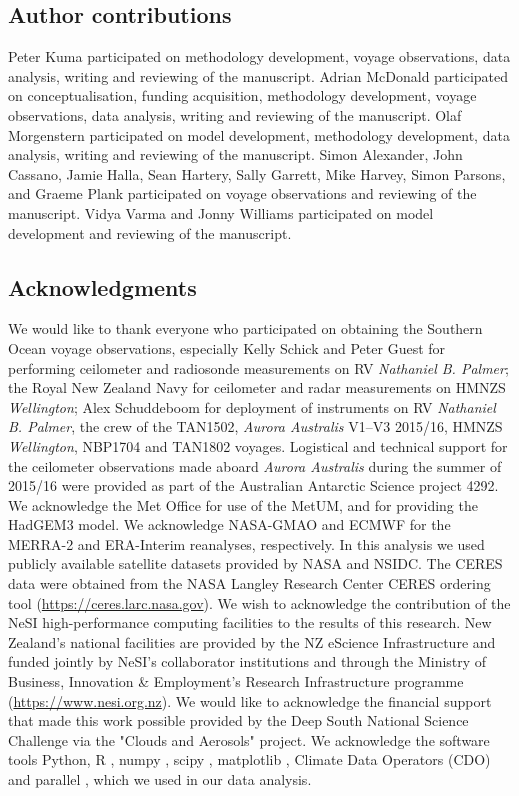 \subsection*{Author contributions}

Peter Kuma participated on methodology development, voyage observations, data
analysis, writing and reviewing of the manuscript. Adrian McDonald participated
on conceptualisation, funding acquisition, methodology development, voyage
observations, data analysis, writing and reviewing of the manuscript. Olaf
Morgenstern participated on model development, methodology development, data
analysis, writing and reviewing of the manuscript. Simon Alexander, John
Cassano, Jamie Halla, Sean Hartery, Sally Garrett, Mike Harvey, Simon Parsons,
and Graeme Plank participated on voyage observations and reviewing of the
manuscript. Vidya Varma and Jonny Williams participated on model development
and reviewing of the manuscript.

\subsection*{Acknowledgments}

We would like to thank everyone who participated on obtaining the Southern
Ocean voyage observations, especially Kelly Schick and Peter Guest for
performing ceilometer and radiosonde measurements on RV \textit{Nathaniel B.
Palmer}; the Royal New Zealand Navy for ceilometer and radar measurements on
HMNZS \textit{Wellington}; Alex Schuddeboom for deployment of instruments on RV
\textit{Nathaniel B. Palmer}, the crew of the TAN1502, \textit{Aurora
Australis} V1--V3 2015/16, HMNZS \textit{Wellington}, NBP1704 and TAN1802
voyages.  Logistical and technical support for the ceilometer observations made
aboard \textit{Aurora Australis} during the summer of 2015/16 were provided as
part of the Australian Antarctic Science project 4292. We acknowledge the Met
Office for use of the MetUM, and for providing the HadGEM3 model. We
acknowledge NASA-GMAO and ECMWF for the MERRA-2 and ERA-Interim reanalyses,
respectively. In this analysis we used publicly available satellite datasets
provided by NASA and NSIDC. The CERES data were obtained from the NASA Langley
Research Center CERES ordering tool (\url{https://ceres.larc.nasa.gov}). We
wish to acknowledge the contribution of the NeSI high-performance computing
facilities to the results of this research. New Zealand's national facilities
are provided by the NZ eScience Infrastructure and funded jointly by NeSI's
collaborator institutions and through the Ministry of Business, Innovation \&
Employment's Research Infrastructure programme (\url{https://www.nesi.org.nz}).
We would like to acknowledge the financial support that made this work possible
provided by the Deep South National Science Challenge via the "Clouds and
Aerosols" project.  We acknowledge the software tools Python, R \citep{r},
numpy \citep{oliphant2006}, scipy \citep{scipy}, matplotlib \citep{hunter2007},
Climate Data Operators (CDO) \citep{schulzweida2018} and parallel
\citep{tange2011}, which we used in our data analysis.

\normalsize
\normalfont
